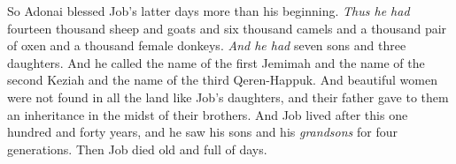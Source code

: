 \begin{biblechapter}
\verse So Adonai blessed Job’s latter days more than his beginning. \textit{Thus he had} fourteen thousand sheep and goats and six thousand camels and a thousand pair of oxen and a thousand female donkeys.
\verse \textit{And he had} seven sons and three daughters.
\verse And he called the name of the first Jemimah and the name of the second Keziah and the name of the third Qeren-Happuk.
\verse And beautiful women were not found in all the land like Job’s daughters, and their father gave to them an inheritance in the midst of their brothers.
\verse And Job lived after this one hundred and forty years, and he saw his sons and his \textit{grandsons} for four generations.
\verse Then Job died old and full of days.
\end{biblechapter}

